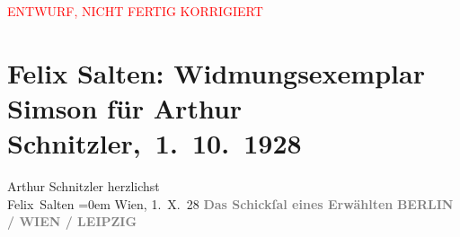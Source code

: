 
\begin{center}
            \textcolor{red}{ENTWURF, NICHT FERTIG KORRIGIERT}
                      \end{center}
            
         
         \renewcommand{\erwaehntePersonen}{Personen: Felix Salten}
         \renewcommand{\erwaehnteInstitutionen}{Institutionen: Paul Zsolnay Verlag}
         \renewcommand{\erwaehnteOrte}{Orte: Berlin, Leipzig, Wien}
         \renewcommand{\erwaehnteWerke}{Werke: Simson. Das Schicksal eines Erwählten}
               \section[ Felix Salten: Widmungsexemplar Simson für Arthur Schnitzler, 1. 10. 1928]{ Felix Salten: Widmungsexemplar Simson für Arthur
               Schnitzler, 1. 10. 1928}\nopagebreak{}\rehead{ }\begin{ledgroupsized}[t]{13cm}\normalsize\beginnumbering \toendnotes[C]{\smallbreak\pagebreak[2]} 
\pstart
           \noindent{}\centering{}{\pb}\textcolor{gray}{\textbf{\textsc{}}}\pend
           \pstart
           \noindent{}\centering{}\textcolor{gray}{\textbf{}}\pend
           \pstart
           \noindent{}\centering{}\textcolor{gray}{\textbf{}}\pend
           \pstart
           \noindent{}Arthur Schnitzler\pend
           \pstart
           herzlichst {\\[\baselineskip]}\spacefill\mbox{Felix Salten}\pend
           \leftskip=0em{}\pstart
           Wien, 1. X. 28\pend
           {\bigskip}\pstart
           \noindent{}\centering{}{\pb}\textcolor{gray}{\textbf{\textsc{}}}\pend
           \pstart
           \noindent{}\centering{}\textcolor{gray}{\textbf{\textbf{}}}\pend
           \pstart
           \noindent{}\centering{}\textcolor{gray}{\textbf{Das Schickſal eines Erwählten}}\pend
           \pstart
           \noindent{}\centering{}\textcolor{gray}{\textbf{\textsc{}}}\pend
           {\bigskip}\pstart
           \noindent{}\centering{}\textcolor{gray}{\textbf{}}\pend
           \pstart
           \noindent{}\centering{}\textcolor{gray}{\textbf{\textsc{}}}\pend
           \pstart
           \noindent{}\centering{}\textcolor{gray}{\textbf{BERLIN / WIEN / LEIPZIG}}\pend
           

\end{ledgroupsized}
